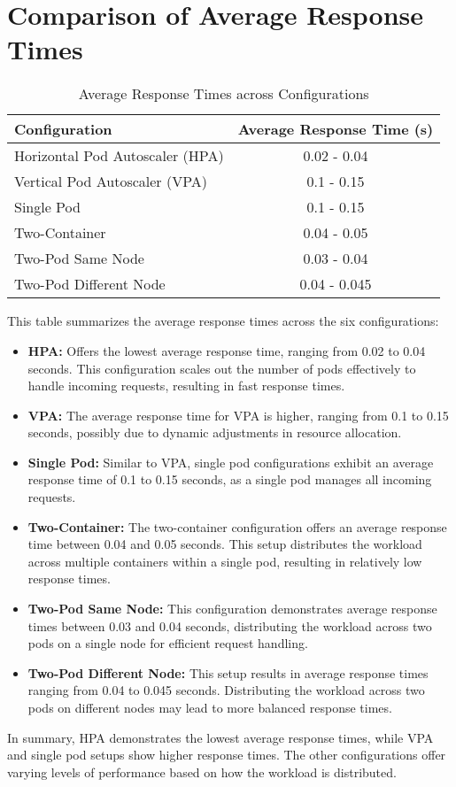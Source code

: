 \section{Comparison of Average Response Times}

\begin{table}[h]
    \centering
    \caption{Average Response Times across Configurations}
    \begin{tabular}{|l|c|}
        \hline
        \textbf{Configuration} & \textbf{Average Response Time (s)} \\
        \hline
        Horizontal Pod Autoscaler (HPA) & 0.02 - 0.04 \\
        Vertical Pod Autoscaler (VPA) & 0.1 - 0.15 \\
        Single Pod & 0.1 - 0.15 \\
        Two-Container & 0.04 - 0.05 \\
        Two-Pod Same Node & 0.03 - 0.04 \\
        Two-Pod Different Node & 0.04 - 0.045 \\
        \hline
    \end{tabular}
    \label{tab:response_times}
\end{table}

\noindent This table summarizes the average response times across the six configurations:

\begin{itemize}
    \item \textbf{HPA:} Offers the lowest average response time, ranging from 0.02 to 0.04 seconds. This configuration scales out the number of pods effectively to handle incoming requests, resulting in fast response times.
    \item \textbf{VPA:} The average response time for VPA is higher, ranging from 0.1 to 0.15 seconds, possibly due to dynamic adjustments in resource allocation.
    \item \textbf{Single Pod:} Similar to VPA, single pod configurations exhibit an average response time of 0.1 to 0.15 seconds, as a single pod manages all incoming requests.
    \item \textbf{Two-Container:} The two-container configuration offers an average response time between 0.04 and 0.05 seconds. This setup distributes the workload across multiple containers within a single pod, resulting in relatively low response times.
    \item \textbf{Two-Pod Same Node:} This configuration demonstrates average response times between 0.03 and 0.04 seconds, distributing the workload across two pods on a single node for efficient request handling.
    \item \textbf{Two-Pod Different Node:} This setup results in average response times ranging from 0.04 to 0.045 seconds. Distributing the workload across two pods on different nodes may lead to more balanced response times.
\end{itemize}

In summary, HPA demonstrates the lowest average response times, while VPA and single pod setups show higher response times. The other configurations offer varying levels of performance based on how the workload is distributed.

